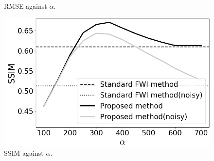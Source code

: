\begin{figure}[htbp]
\begin{minipage}{58mm}
        \caption{RMSE against $\alpha$.}
        \label{fig:alpha-rmse}
    \end{minipage}
    \hspace{-2mm}
    \begin{minipage}{58mm}
        \centering
        \includegraphics[width=\linewidth]{public/alpha-ssim}
        \caption{SSIM against $\alpha$.}
        \label{fig:alpha-ssim}
        \vspace{3mm}
    \end{minipage}
\end{figure}
